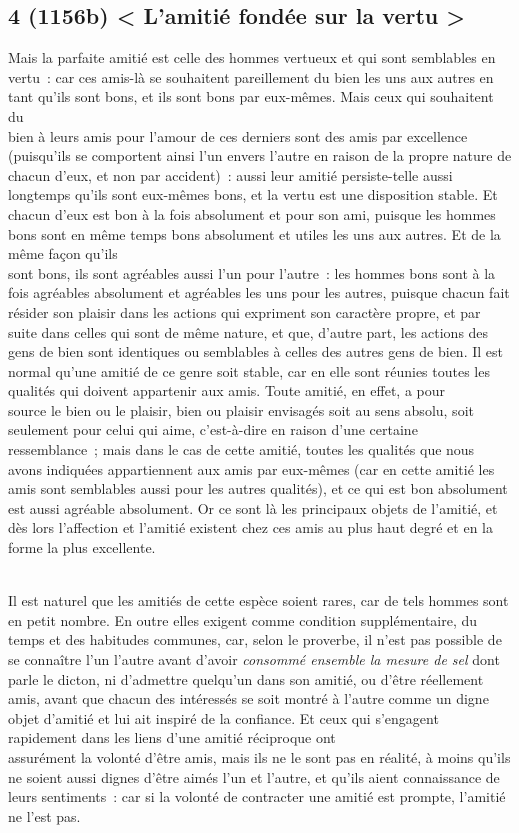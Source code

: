 \documentclass[french,twoside]{book} %
\begin{document}
\subsection[{4 (1156b) < L’amitié fondée sur la vertu >}]{4 (1156b) < L’amitié fondée sur la vertu >}
\noindent Mais la parfaite amitié est celle des hommes vertueux et qui sont semblables en vertu : car ces amis-là se souhaitent pareillement du bien les uns aux autres en tant qu’ils sont bons, et ils sont bons par eux-mêmes. Mais ceux qui souhaitent du \\
bien à leurs amis pour l’amour de ces derniers sont des amis par excellence (puisqu’ils se comportent ainsi l’un envers l’autre en raison de la propre nature de chacun d’eux, et non par accident) : aussi leur amitié persiste-telle aussi longtemps qu’ils sont eux-mêmes bons, et la vertu est une disposition stable. Et chacun d’eux est bon à la fois absolument et pour son ami, puisque les hommes bons sont en même temps bons absolument et utiles les uns aux autres. Et de la même façon qu’ils \\
sont bons, ils sont agréables aussi l’un pour l’autre : les hommes bons sont à la fois agréables absolument et agréables les uns pour les autres, puisque chacun fait résider son plaisir dans les actions qui expriment son caractère propre, et par suite dans celles qui sont de même nature, et que, d’autre part, les actions des gens de bien sont identiques ou semblables à celles des autres gens de bien. Il est normal qu’une amitié de ce genre soit stable, car en elle sont réunies toutes les qualités qui doivent appartenir aux amis. Toute amitié, en effet, a pour \\
source le bien ou le plaisir, bien ou plaisir envisagés soit au sens absolu, soit seulement pour celui qui aime, c’est-à-dire en raison d’une certaine ressemblance ; mais dans le cas de cette amitié, toutes les qualités que nous avons indiquées appartiennent aux amis par eux-mêmes (car en cette amitié les amis sont semblables aussi pour les autres qualités), et ce qui est bon absolument est aussi agréable absolument. Or ce sont là les principaux objets de l’amitié, et dès lors l’affection et l’amitié existent chez ces amis au plus haut degré et en la forme la plus excellente.\par
\\
Il est naturel que les amitiés de cette espèce soient rares, car de tels hommes sont en petit nombre. En outre elles exigent comme condition supplémentaire, du temps et des habitudes communes, car, selon le proverbe, il n’est pas possible de se connaître l’un l’autre avant d’avoir {\itshape consommé ensemble la mesure de sel} dont parle le dicton, ni d’admettre quelqu’un dans son amitié, ou d’être réellement amis, avant que chacun des intéressés se soit montré à l’autre comme un digne objet d’amitié et lui ait inspiré de la confiance. Et ceux qui s’engagent rapidement dans les liens d’une amitié réciproque ont \\
assurément la volonté d’être amis, mais ils ne le sont pas en réalité, à moins qu’ils ne soient aussi dignes d’être aimés l’un et l’autre, et qu’ils aient connaissance de leurs sentiments : car si la volonté de contracter une amitié est prompte, l’amitié ne l’est pas.
\end{document}
